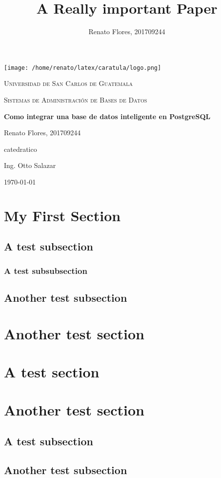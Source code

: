 \documentclass[titlepage]{article} %
\author{Renato Flores, 201709244}
\title{A Really important Paper}
\newcommand*\rbreak{\par\noindent\linebreak}
\begin{document}
\begin{titlepage}
	\centering
	\texttt{[image: /home/renato/latex/caratula/logo.png]}\par\vspace{1cm}
	{\scshape\LARGE Universidad de San Carlos de Guatemala \par}
	\vspace{1cm}
	{\scshape\Large Sistemas de Administración de Bases de Datos \par}
	\vspace{1.5cm}
	{\huge\bfseries Como integrar una base de datos inteligente en PostgreSQL \par}
	\vspace{2cm}
	{\Large Renato Flores, 201709244\par}
	\vfill
	catedratico\par
	Ing. Otto Salazar

	\vfill

	{\large \today\par}
\end{titlepage}

\tableofcontents
\clearpage

\section{My First Section}
	\blindtext
	\subsection{A test subsection}
		\blindtext
		\subsubsection{A test subsubsection}
			\blindtext \rbreak %
			\blindtext \rbreak
			\blindtext
		\subsection{Another test subsection}
			\blindtext
	\section{Another test section}
		\blindtext
	\section{A test section}
		\blindtext
	\section{Another test section}
		\blindtext
		\subsection{A test subsection}
			\blindtext
		\subsection{Another test subsection}
			\blindtext
\end{document}
